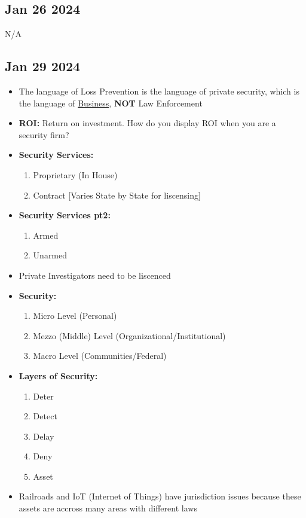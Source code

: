 \documentclass[12pt]{article}
\begin{document}
\subsection*{Jan 26 2024}

N/A

\subsection*{Jan 29 2024}

\begin{itemize}
		  \item The language of Loss Prevention is the language of private security, which is the language of 
					 \underline{Business}, \textbf{NOT} Law Enforcement
		  \item \textbf{ROI:} Return on investment. How do you display ROI when you are a security firm?
		  \item \textbf{Security Services:}
					 \begin{enumerate}
								\item Proprietary (In House) 
								\item Contract [Varies State by State for liscensing]
					 \end{enumerate}
		  \item \textbf{Security Services pt2:}
					 \begin{enumerate}
								\item Armed 
								\item Unarmed
					 \end{enumerate}
		  \item Private Investigators need to be liscenced
		  \item \textbf{Security:} 
					 \begin{enumerate}
								\item Micro Level (Personal)
								\item Mezzo (Middle) Level (Organizational/Institutional)
								\item Macro Level (Communities/Federal)
					 \end{enumerate}
		  \item \textbf{Layers of Security:} 
					 \begin{enumerate}
								\item Deter
								\item Detect
								\item Delay
								\item Deny
								\item Asset
					 \end{enumerate}
		  \item Railroads and IoT (Internet of Things) have jurisdiction issues because these 
					 assets are accross many areas with different laws
\end{itemize}
\end{document}
